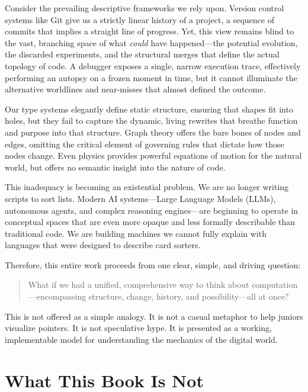 Consider the prevailing descriptive frameworks we rely upon. Version control systems like Git give us a strictly linear history of a project, a sequence of commits that implies a straight line of progress. Yet, this view remains blind to the vast, branching space of what \textit{could} have happened—the potential evolution, the discarded experiments, and the structural merges that define the actual topology of code. A debugger exposes a single, narrow execution trace, effectively performing an autopsy on a frozen moment in time, but it cannot illuminate the alternative worldlines and near-misses that almost defined the outcome.

Our type systems elegantly define static structure, ensuring that shapes fit into holes, but they fail to capture the dynamic, living rewrites that breathe function and purpose into that structure. Graph theory offers the bare bones of nodes and edges, omitting the critical element of governing rules that dictate how those nodes change. Even physics provides powerful equations of motion for the natural world, but offers no semantic insight into the nature of code.

This inadequacy is becoming an existential problem. We are no longer writing scripts to sort lists. Modern AI systems—Large Language Models (LLMs), autonomous agents, and complex reasoning engines—are beginning to operate in conceptual spaces that are even more opaque and less formally describable than traditional code. We are building machines we cannot fully explain with languages that were designed to describe card sorters.

Therefore, this entire work proceeds from one clear, simple, and driving question:

\begin{quote}
    What if we had a unified, comprehensive way to think about computation—encompassing structure, change, history, and possibility—all at once?
\end{quote}

This is not offered as a simple analogy. It is not a casual metaphor to help juniors visualize pointers. It is not speculative hype. It is presented as a working, implementable model for understanding the mechanics of the digital world.

\section{What This Book Is Not}
\label{sec:what-is-not}

